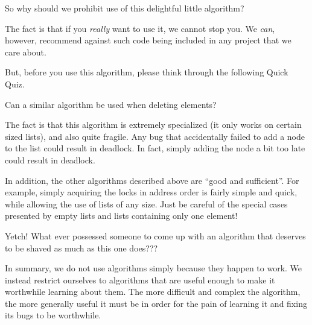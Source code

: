 So why should we prohibit use of this delightful little algorithm?

The fact is that if you \emph{really} want to use it, we cannot stop you.
We \emph{can}, however, recommend against such code being included
in any project that we care about.

But, before you use this algorithm, please think through the following
Quick Quiz.

\QuickQuiz{}
	Can a similar algorithm be used when deleting elements?
 \QuickQuizEnd

The fact is that this algorithm is extremely specialized (it only works
on certain sized lists), and also quite fragile.
Any bug that accidentally failed to add a node to the list could result
in deadlock.
In fact, simply adding the node a bit too late could result in deadlock.

In addition, the other algorithms described above are ``good and sufficient''.
For example, simply acquiring the locks in address order is fairly simple
and quick, while allowing the use of lists of any size.
Just be careful of the special cases presented by empty lists and lists
containing only one element!

\QuickQuiz{}
	Yetch!
	What ever possessed someone to come up with an algorithm
	that deserves to be shaved as much as this one does???
 \QuickQuizEnd

In summary, we do not use algorithms simply because they happen to work.
We instead restrict ourselves to algorithms that are useful enough to
make it worthwhile learning about them.
The more difficult and complex the algorithm, the more generally useful
it must be in order for the pain of learning it and fixing its bugs to
be worthwhile.

